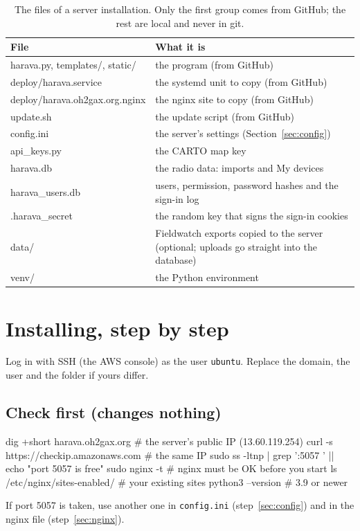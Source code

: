 \documentclass[10pt,a4paper]{article}
\begin{document}
\begin{table}[H]\small\centering
\caption{The files of a server installation. Only the first group comes from GitHub; the rest are local and never in git.}
\begin{tabularx}{\textwidth}{>{\ttfamily\raggedright}p{5.4cm}X}
\toprule
\normalfont\textbf{File} & \textbf{What it is}\\
\midrule
harava.py, templates/, static/ & the program (from GitHub)\\
deploy/harava.service & the systemd unit to copy (from GitHub)\\
deploy/harava.oh2gax.org.nginx & the nginx site to copy (from GitHub)\\
update.sh & the update script (from GitHub)\\
\midrule
config.ini & the server's settings (Section~\ref{sec:config})\\
api\_keys.py & the CARTO map key\\
harava.db & the radio data: imports and My devices\\
harava\_users.db & users, permission, password hashes and the sign-in log\\
.harava\_secret & the random key that signs the sign-in cookies\\
data/ & Fieldwatch exports copied to the server (optional; uploads go straight into the database)\\
venv/ & the Python environment\\
\bottomrule
\end{tabularx}
\end{table}

\section{Installing, step by step}\label{sec:install}
Log in with SSH (the AWS console) as the user \texttt{ubuntu}. Replace the domain, the user and the folder if yours differ.

\subsection{Check first (changes nothing)}
\begin{cmd}
dig +short harava.oh2gax.org          # the server's public IP (13.60.119.254)
curl -s https://checkip.amazonaws.com # the same IP
sudo ss -ltnp | grep ':5057 ' || echo "port 5057 is free"
sudo nginx -t                         # nginx must be OK before you start
ls /etc/nginx/sites-enabled/          # your existing sites
python3 --version                     # 3.9 or newer
\end{cmd}
If port 5057 is taken, use another one in \texttt{config.ini} (step~\ref{sec:config}) and in the nginx file (step~\ref{sec:nginx}).
\end{document}
